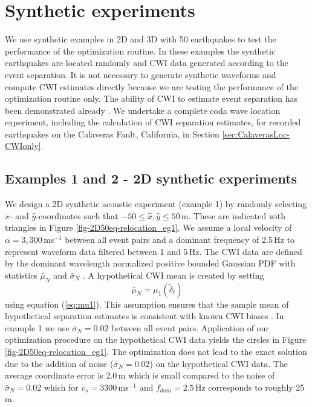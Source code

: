 \documentclass[extra, onecolumn, doublespacing]{gji}
\begin{document}
\section{Synthetic experiments}
\label{sec:benchmarking}

We use synthetic examples in 2D and 3D with 50 earthquakes to test
the performance of the optimization routine. In these examples the
synthetic earthquakes are located randomly and CWI data generated
according to the event separation. It is not necessary to generate
synthetic waveforms and compute CWI estimates directly because we
are testing the performance of the optimization routine only. The
ability of CWI to estimate event separation has been demonstrated
already \citep{dr_Snieder05a, dr_Robinson07b, dr_Robinson11a}. We
undertake a complete coda wave location experiment, including the
calculation of CWI separation estimates, for recorded earthquakes on
the Calaveras Fault, California, in Section
\ref{sec:CalaverasLoc-CWIonly}.

\subsection{Examples 1 and 2 - 2D synthetic experiments}

We design a 2D synthetic acoustic experiment (example 1) by randomly
selecting $\hat{x}$- and $\hat{y}$-coordinates such that $-50 \leq
\hat{x}, \hat{y} \leq 50$\,m. These are indicated with triangles in
Figure \ref{fig-2D50eq-relocation_eg1}.
 We assume a local velocity of $\alpha=3,300\,$ms$^{-1}$ between all
event pairs and a dominant frequency of 2.5$\,$Hz to represent
waveform data filtered between 1 and 5$\,$Hz. The CWI data are
defined by the dominant wavelength normalized positive bounded
Gaussian PDF with statistics $\bar{\mu}_N$ and $\bar{\sigma}_N$
\citep{dr_Robinson11a}. A hypothetical CWI mean is created by
setting
\begin{equation}
\label{eq:hypothetical-CWI-mean-optichapt}
\bar{\mu}_N = \mu_1 \left( \widetilde{\delta}_t \right)
\end{equation}
using equation (\ref{eq:mu1}). This assumption ensures that the
sample mean of hypothetical separation estimates is consistent with
known CWI biases \citep{dr_Robinson11a}. In example 1 we use
$\bar{\sigma}_N=0.02$ between all event pairs. Application of our
optimization procedure on the hypothetical CWI data yields the
circles in Figure \ref{fig-2D50eq-relocation_eg1}. The optimization
does not lead to the exact solution due to the addition of noise
($\bar{\sigma}_N=0.02$) on the hypothetical CWI data. The average
coordinate error is 2.0\,m which is small compared to the noise of
$\bar{\sigma}_N=0.02$ which for $v_s=3300$\,ms$^{-1}$ and
$f_{dom}=2.5$\,Hz corresponds to roughly 25\,m.
\end{document}
